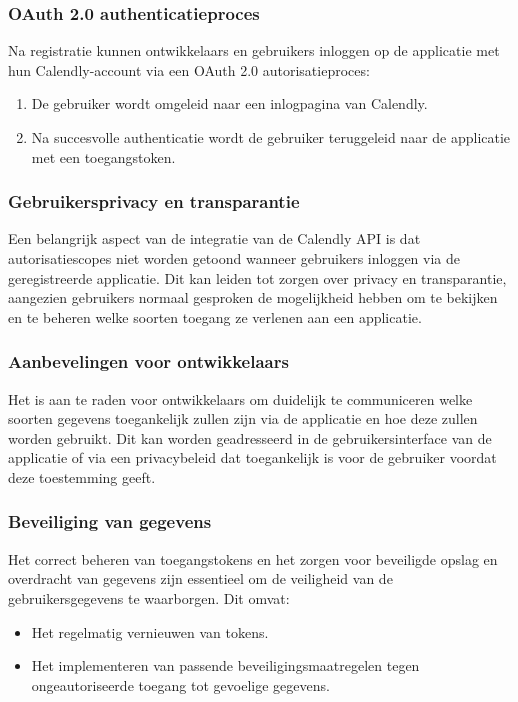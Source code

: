 \subsubsection{OAuth 2.0 authenticatieproces}
Na registratie kunnen ontwikkelaars en gebruikers inloggen op de applicatie met hun Calendly-account via een OAuth 2.0 autorisatieproces:
\begin{enumerate}
    \item De gebruiker wordt omgeleid naar een inlogpagina van Calendly.
    \item Na succesvolle authenticatie wordt de gebruiker teruggeleid naar de applicatie met een toegangstoken.
\end{enumerate}

\subsubsection{Gebruikersprivacy en transparantie}
Een belangrijk aspect van de integratie van de Calendly API is dat autorisatiescopes niet worden getoond wanneer gebruikers inloggen via de geregistreerde applicatie. Dit kan leiden tot zorgen over privacy en transparantie, aangezien gebruikers normaal gesproken de mogelijkheid hebben om te bekijken en te beheren welke soorten toegang ze verlenen aan een applicatie.

\subsubsection{Aanbevelingen voor ontwikkelaars}
Het is aan te raden voor ontwikkelaars om duidelijk te communiceren welke soorten gegevens toegankelijk zullen zijn via de applicatie en hoe deze zullen worden gebruikt. Dit kan worden geadresseerd in de gebruikersinterface van de applicatie of via een privacybeleid dat toegankelijk is voor de gebruiker voordat deze toestemming geeft.

\subsubsection{Beveiliging van gegevens}
Het correct beheren van toegangstokens en het zorgen voor beveiligde opslag en overdracht van gegevens zijn essentieel om de veiligheid van de gebruikersgegevens te waarborgen. Dit omvat:
\begin{itemize}
    \item Het regelmatig vernieuwen van tokens.
    \item Het implementeren van passende beveiligingsmaatregelen tegen ongeautoriseerde toegang tot gevoelige gegevens.
\end{itemize}

